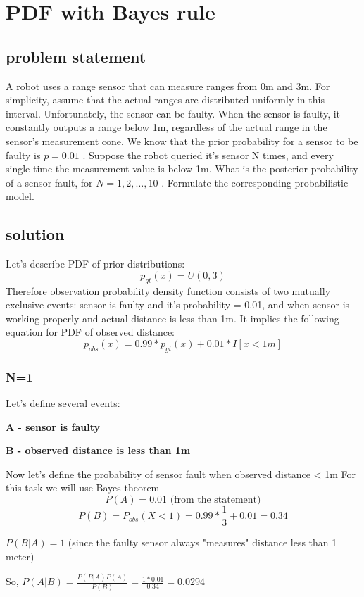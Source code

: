 \documentclass{article}
\begin{document}
\section{PDF with Bayes rule}

\subsection*{problem statement}
A robot uses a range sensor that can measure ranges from 0m and 3m. For simplicity, assume that the actual ranges are distributed uniformly in this interval. Unfortunately, the sensor can be faulty. When the sensor is faulty, it constantly outputs a range below 1m, regardless of the actual range in the sensor's measurement cone. We know that the prior probability for a sensor to be faulty is  $p=0.01$ .
Suppose the robot queried it's sensor N times, and every single time the measurement value is below 1m. What is the posterior probability of a sensor fault, for  $N=1,2,\dots,10$ . Formulate the corresponding probabilistic model.
\subsection*{solution}
Let's describe PDF of prior distributions:
$$ p_{gt}(x) = U(0,3) $$
Therefore observation probability density function consists of two mutually exclusive events: sensor is faulty and it's probability = 0.01, and when sensor is working properly and actual distance is less than 1m. 
It implies the following equation for PDF of observed distance:
$$ p_{obs}(x) = 0.99*p_{gt}(x) + 0.01 * I[x<1m]$$

\subsubsection*{N=1}

Let's define several events:


\textbf{A - sensor is faulty}


\textbf{B - observed distance is less than 1m}


Now let's define the probability of sensor fault when observed distance < 1m
For this task we will use Bayes theorem
$$ P(A) = 0.01 \text{ (from the statement)}$$
$$ P(B) = P_{obs}(X<1) = 0.99 * \frac{1}{3} + 0.01 = 0.34 $$


$P(B|A) = 1$ (since the faulty sensor always "measures" distance less than 1 meter)


So, $P(A|B)=\frac{P(B|A)P(A)}{P(B)} = \frac{1 * 0.01}{0.34} = 0.0294$
\end{document}
